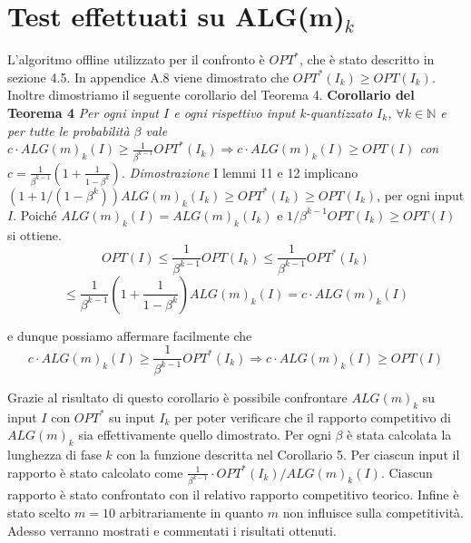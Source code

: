 \documentclass[twoside,openany,titlepage,fleqn,
	headinclude,12pt,a4paper,BCOR5mm,footinclude]{scrbook}
\newcommand*{\N}{\mathbb{N}}
\begin{document}
\section{Test effettuati su ALG(m)$_{k}$}
L’algoritmo offline utilizzato per il confronto è $OPT^{*}$, che è stato descritto in sezione 4.5. In appendice A.8 viene dimostrato che $OPT^{*}(I_{k}) \geq OPT(I_{k})$. Inoltre dimostriamo il seguente corollario del Teorema 4.
\newline \newline
\textbf{Corollario del Teorema 4}
\textit{Per ogni input $I$ e ogni rispettivo input k-quantizzato $I_{k}$, $\forall k \in \N$ e per tutte le probabilità $\beta$ vale
$ c \cdot ALG(m)_{k}(I) \geq \frac{1}{\beta^{k-1}} OPT^{*}(I_{k}) \Longrightarrow c \cdot ALG(m)_{k}(I) \geq OPT(I) $ con $c = \frac{1}{\beta^{k - 1} } (1 + \frac{1}{1 - \beta^{k}})$.}
\newline \newline
\textit{Dimostrazione} 
I lemmi 11 e 12 implicano $(1 + 1 / (1 - \beta^{k}))ALG(m)_{k}(I_{k}) \geq OPT^{*}(I_{k}) \geq OPT (I_{k})$, per ogni input $I$. Poiché $ALG(m)_{k}(I) = ALG(m)_{k}(I_{k})$ e $1 / \beta^{k-1}OPT (I_{k}) \geq OPT (I)$ si ottiene. 
$$OPT(I) \leq \frac{1}{\beta^{k-1}} OPT(I_{k}) \leq \frac{1}{\beta^{k-1}} OPT^{*}(I_{k})$$
$$\leq \frac{1}{\beta^{k-1}} (1 + \frac{1}{1 - \beta^{k}}) ALG(m)_{k}(I) = c \cdot ALG(m)_{k}(I) $$

e dunque possiamo affermare facilmente che 
\begin{equation}
c \cdot ALG(m)_{k}(I) \geq \frac{1}{\beta^{k-1}} OPT^{*}(I_{k}) \Longrightarrow c \cdot ALG(m)_{k}(I) \geq OPT(I) \tag*{$\square$}
\end{equation}

Grazie al risultato di questo corollario è possibile confrontare $ALG(m)_{k}$ su input $I$ con $OPT^{*}$ su input $I_{k}$ per poter verificare che il rapporto competitivo di $ALG(m)_{k}$ sia effettivamente quello dimostrato. Per ogni $\beta$ è stata calcolata la lunghezza di fase $k$ con la funzione descritta nel Corollario 5. Per ciascun input il rapporto è stato calcolato come $\frac{1}{\beta^{k-1}} \cdot OPT^{*}(I_{k}) / ALG(m)_{k}(I)$. Ciascun rapporto è stato confrontato con il relativo rapporto competitivo teorico. Infine è stato scelto $m=10$ arbitrariamente in quanto $m$ non influisce sulla competitività. Adesso verranno mostrati e commentati i risultati ottenuti.
\end{document}
